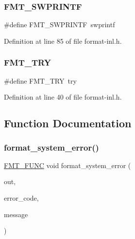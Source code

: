 \subsubsection{\texorpdfstring{F\+M\+T\+\_\+\+S\+W\+P\+R\+I\+N\+TF}{FMT\_SWPRINTF}}
{\footnotesize\ttfamily \#define F\+M\+T\+\_\+\+S\+W\+P\+R\+I\+N\+TF~swprintf}



Definition at line 85 of file format-\/inl.\+h.

\mbox{\label{format-inl_8h_a4aa79926398ee27fe7d6db8b0dd54edf}} 
\subsubsection{\texorpdfstring{F\+M\+T\+\_\+\+T\+RY}{FMT\_TRY}}
{\footnotesize\ttfamily \#define F\+M\+T\+\_\+\+T\+RY~try}



Definition at line 40 of file format-\/inl.\+h.



\subsection{Function Documentation}
\mbox{\label{format-inl_8h_a4826487444d21827180f5fbce3c64508}} 
\subsubsection{\texorpdfstring{format\+\_\+system\+\_\+error()}{format\_system\_error()}}
{\footnotesize\ttfamily \hyperlink{format_8h_a02c8898388e0ae59aab58be14fcd4e05}{F\+M\+T\+\_\+\+F\+U\+NC} void format\+\_\+system\+\_\+error (\begin{DoxyParamCaption}\item[{\hyperlink{namespaceinternal_a5fcdbc3efad1f390e6c3f0fdafa56122}{internal\+::buffer} \&}]{out,  }\item[{int}]{error\+\_\+code,  }\item[{\hyperlink{core_8h_a17e3ff7f9ac2b8f068f719b829890036}{fmt\+::string\+\_\+view}}]{message }\end{DoxyParamCaption})}

